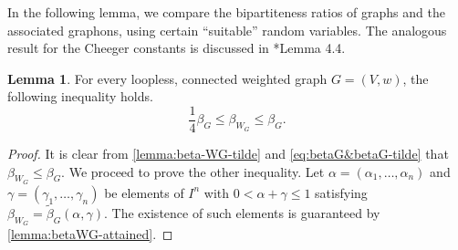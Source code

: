 \documentclass[12pt,a4paper,bold]{thesis}
\theoremstyle{definition}
\newtheorem{lemma}[thm]{Lemma}
\begin{document}
In the following lemma, we compare the bipartiteness ratios of graphs and 
the associated graphons, using certain ``suitable'' random variables. 
The analogous result for the Cheeger constants is discussed in \cite{Abhishek-Mahan24}*{Lemma 4.4}.

\begin{lemma} \label{lemma:compare-betaG&WG}
    For every loopless, connected weighted graph $G = (V,w)$, the following inequality holds.
    \begin{equation*}
        \frac{1}{4} \beta_{G} \leq \beta_{W_G} \leq \beta_G.
    \end{equation*}
\end{lemma}

\begin{proof}
    It is clear from \cref{lemma:beta-WG-tilde} and \cref{eq:betaG&betaG-tilde} 
    that $\beta_{W_G} \leq \beta_G$. We proceed to prove the other inequality.
    Let $\alpha = (\alpha_1, \dots, \alpha_n)$ and $\gamma = (\gamma_1, \dots, \gamma_n)$ 
    be elements of $I^n$ with $0 < \alpha + \gamma \leq 1$ satisfying 
    $\beta_{W_G} = \tilde \beta_G(\alpha, \gamma)$. 
    The existence of such elements is guaranteed by \cref{lemma:betaWG-attained}.


\end{proof}
\end{document}
